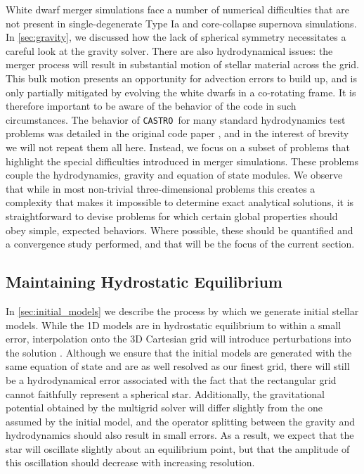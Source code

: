 \documentclass[iop]{../emulateapj}
\newcommand{\castro}{\texttt{CASTRO}}
\begin{document}
White dwarf merger simulations face a number of numerical difficulties that are
not present in single-degenerate Type Ia and core-collapse supernova
simulations. In \autoref{sec:gravity}, we discussed how the lack
of spherical symmetry necessitates a careful look at the gravity
solver. There are also hydrodynamical issues: the merger process will
result in substantial motion of stellar material across the grid. This
bulk motion presents an opportunity for advection errors to build up,
and is only partially mitigated by evolving the white dwarfs in a
co-rotating frame. It is therefore important to be aware of the
behavior of the code in such circumstances. The behavior of \castro\ for
many standard hydrodynamics test problems was detailed in the original
code paper \citep{castro}, and in the interest of brevity we will not
repeat them all here. Instead, we focus on a subset of problems that
highlight the special difficulties introduced in merger
simulations. These problems couple the hydrodynamics, gravity and
equation of state modules. We observe that while in most non-trivial
three-dimensional problems this creates a complexity that makes it
impossible to determine exact analytical solutions, it is
straightforward to devise problems for which certain global properties
should obey simple, expected behaviors. Where possible, these should
be quantified and a convergence study performed, and that will 
be the focus of the current section.

\subsection{Maintaining Hydrostatic Equilibrium}\label{sec:HSE}

In \autoref{sec:initial_models} we describe the process by which
we generate initial stellar models. While the 1D models are in
hydrostatic equilibrium to within a small error, interpolation onto
the 3D Cartesian grid will introduce perturbations into the solution
\citep{zingale:2002}. Although we ensure that the initial models are
generated with the same equation of state and are as well resolved as
our finest grid, there will still be a hydrodynamical error associated
with the fact that the rectangular grid cannot faithfully represent a
spherical star. Additionally, the gravitational potential obtained by
the multigrid solver will differ slightly from the one assumed by the
initial model, and the operator splitting between the gravity and
hydrodynamics should also result in small errors. As a result, we
expect that the star will oscillate slightly about an equilibrium
point, but that the amplitude of this oscillation should decrease with
increasing resolution.
\end{document}
